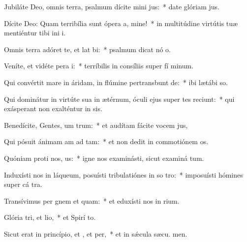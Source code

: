 \item Jubiláte Deo, omnis terra, psalmum dícite mini jus:~* date glóriam  jus.
\item Dícite Deo: Quam terribília sunt ópera a, mine!~* in multitúdine virtútis tuæ mentiéntur tibi ini i.
\item Omnis terra adóret te, et lat bi:~* psalmum dicat nó o.
\item Veníte, et vidéte pera i:~* terríbilis in consíliis super fí minum.
\item Qui convértit mare in áridam, in flúmine pertransbunt de:~* ibi lætábi  so.
\item Qui dominátur in virtúte sua in ætérnum, óculi ejus super tes reciunt:~* qui exásperant non exalténtur in sis.
\item Benedícite, Gentes, um trum:~* et audítam fácite vocem  jus,
\item Qui pósuit ánimam am ad tam:~* et non dedit in commotiónem  os.
\item Quóniam proti nos, us:~* igne nos examinásti, sicut examiná tum.
\item Induxísti nos in láqueum, posuísti tribulatiónes in so tro:~* imposuísti hómines super cá tra.
\item Transívimus per gnem et quam:~* et eduxísti nos in rium.
\item Glória tri, et lio,~* et Spirí to.
\item Sicut erat in princípio, et , et per,~* et in sǽcula sæcu. men.
